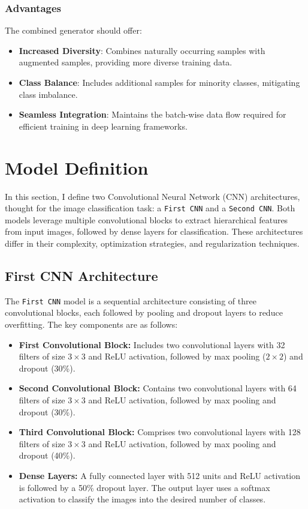 \documentclass{article}
\begin{document}
\subsubsection{Advantages}

The combined generator should offer:
\begin{itemize}
    \item \textbf{Increased Diversity}: Combines naturally occurring samples with augmented samples, providing more diverse training data.
    \item \textbf{Class Balance}: Includes additional samples for minority classes, mitigating class imbalance.
    \item \textbf{Seamless Integration}: Maintains the batch-wise data flow required for efficient training in deep learning frameworks.
\end{itemize}

\section{Model Definition}

In this section, I define two Convolutional Neural Network (CNN) architectures, thought for the image classification task: a \texttt{First CNN} and a \texttt{Second CNN}. Both models leverage multiple convolutional blocks to extract hierarchical features from input images, followed by dense layers for classification. These architectures differ in their complexity, optimization strategies, and regularization techniques.

\subsection{First CNN Architecture}

The \texttt{First CNN} model is a sequential architecture consisting of three convolutional blocks, each followed by pooling and dropout layers to reduce overfitting. The key components are as follows:
\begin{itemize}
    \item \textbf{First Convolutional Block:} Includes two convolutional layers with 32 filters of size \(3 \times 3\) and ReLU activation, followed by max pooling (\(2 \times 2\)) and dropout (30\%).
    \item \textbf{Second Convolutional Block:} Contains two convolutional layers with 64 filters of size \(3 \times 3\) and ReLU activation, followed by max pooling and dropout (30\%).
    \item \textbf{Third Convolutional Block:} Comprises two convolutional layers with 128 filters of size \(3 \times 3\) and ReLU activation, followed by max pooling and dropout (40\%).
    \item \textbf{Dense Layers:} A fully connected layer with 512 units and ReLU activation is followed by a 50\% dropout layer. The output layer uses a softmax activation to classify the images into the desired number of classes.
\end{itemize}
\end{document}
